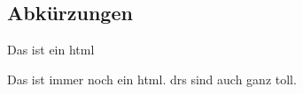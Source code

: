 \subsection{Abkürzungen}\label{subsec:abbrev}
	
Das ist ein \ac{html}
	
\newpage
	
Das ist immer noch ein \ac{html}. \acp{dr} sind auch ganz toll.